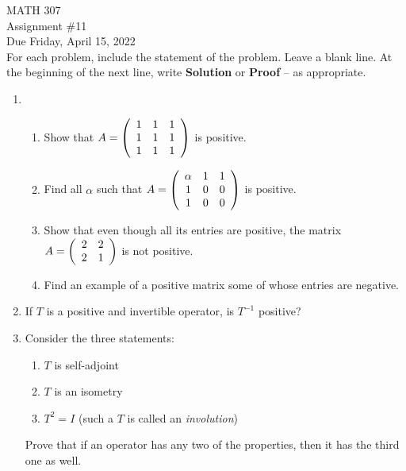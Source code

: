 \documentclass[12pt]{article}
\begin{document}
\noindent MATH 307 \\
Assignment \#11 \\
Due Friday, April 15, 2022 \\

For each problem, include the statement of the problem. Leave a blank line.  At the beginning of the next line, write \textbf{Solution} or \textbf{Proof} -- as appropriate.

\begin{enumerate}
\item \begin{enumerate}
        \item Show that
        $A=\left( \begin{array} {c c c} 1 & 1 & 1 \\ 1 & 1 & 1 \\1 & 1 & 1 \end{array} \right)$ is positive.

        \item Find all $\alpha$ such that
        $A=\left( \begin{array} {c c c} \alpha & 1 & 1 \\ 1 & 0 & 0 \\1 & 0 & 0 \end{array} \right)$ is positive.

        \item Show that even though all its entries are positive, the matrix
        $A=\left( \begin{array} {c c c} 2 & 2  \\ 2 & 1  \end{array} \right)$
        is not positive.

        \item Find an example of a positive matrix some of whose entries are negative.
        \end{enumerate}

\item If $T$ is a positive and invertible operator, is $T^{-1}$ positive?

\item Consider the three statements:
    \begin{enumerate}
        \item $T$ is self-adjoint
        \item $T$ is an isometry
        \item $T^2=I$ (such a $T$ is called an \emph{involution})
    \end{enumerate}
    Prove that if an operator has any two of the properties, then it has the third one as well.


\end{enumerate}
\end{document}
